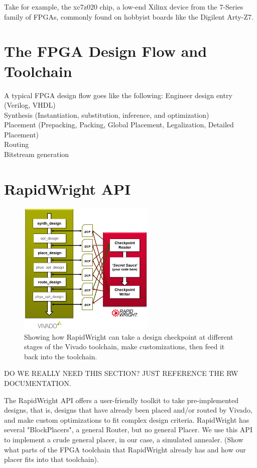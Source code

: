 \documentclass[twocolumn]{article}
\begin{document}
    Take for example, the xc7z020 chip, a low-end Xilinx device from the 7-Series family of FPGAs, commonly found on hobbyist boards like the Digilent Arty-Z7. 

\section{The FPGA Design Flow and Toolchain}

    

    A typical FPGA design flow goes like the following: 
    Engineer design entry (Verilog, VHDL) \\ 
    Synthesis (Instantiation, substitution, inference, and optimization) \\ 
    Placement (Prepacking, Packing, Global Placement, Legalization, Detailed Placement)\\ 
    Routing \\ 
    Bitstream generation \\ 

\section{RapidWright API}

    \begin{figure}
        \centering
        \includegraphics[width=6.5cm]{figures/vivado_dcps.png}
        \caption{Showing how RapidWright can take a design checkpoint at different stages of the Vivado toolchain, make customizations, then feed it back into the toolchain.}
        \label{fig:device_carry_chain_routing}
    \end{figure}

    DO WE REALLY NEED THIS SECTION? JUST REFERENCE THE RW DOCUMENTATION.

    The RapidWright API offers a user-friendly toolkit to take pre-implemented designs, that is, designs that have already been placed and/or routed by Vivado, and make custom optimizations to fit complex design criteria. 
    RapidWright has several "BlockPlacers", a general Router, but no general Placer. 
    We use this API to implement a crude general placer, in our case, a simulated annealer. 
    (Show what parts of the FPGA toolchain that RapidWright already has and how our placer fits into that toolchain). 
\end{document}
